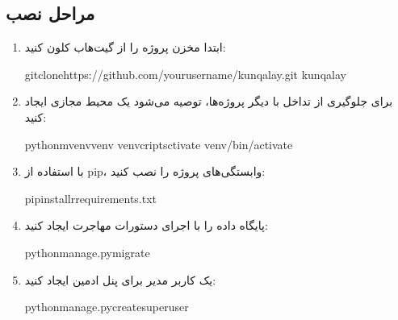 \documentclass[letterpaper,10pt,english]{sphinxmanual}
\begin{document}
\subsection{مراحل نصب}
\label{\detokenize{installation/index:id3}}\begin{enumerate}
%
\item {} 
\sphinxAtStartPar
{}

\sphinxAtStartPar
ابتدا مخزن پروژه را از گیت‌هاب کلون کنید:

\begin{sphinxVerbatim}[commandchars=\\\{\}]
gitclonehttps://github.com/your\PYGZhy{}username/kunqalay.git
kunqalay
\end{sphinxVerbatim}

\item {} 
\sphinxAtStartPar
{}

\sphinxAtStartPar
برای جلوگیری از تداخل با دیگر پروژه‌ها، توصیه می‌شود یک محیط مجازی ایجاد کنید:

\begin{sphinxVerbatim}[commandchars=\\\{\}]
python\PYGZhy{}mvenvvenv
venvcriptsctivate
venv/bin/activate
\end{sphinxVerbatim}

\item {} 
\sphinxAtStartPar
{}

\sphinxAtStartPar
با استفاده از pip، وابستگی‌های پروژه را نصب کنید:

\begin{sphinxVerbatim}[commandchars=\\\{\}]
pipinstall\PYGZhy{}rrequirements.txt
\end{sphinxVerbatim}

\item {} 
\sphinxAtStartPar
{}

\sphinxAtStartPar
پایگاه داده را با اجرای دستورات مهاجرت ایجاد کنید:

\begin{sphinxVerbatim}[commandchars=\\\{\}]
pythonmanage.pymigrate
\end{sphinxVerbatim}

\item {} 
\sphinxAtStartPar
{}

\sphinxAtStartPar
یک کاربر مدیر برای پنل ادمین ایجاد کنید:

\begin{sphinxVerbatim}[commandchars=\\\{\}]
pythonmanage.pycreatesuperuser
\end{sphinxVerbatim}

\end{enumerate}
\end{document}
